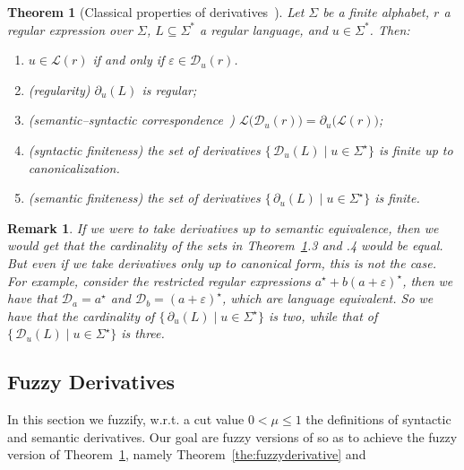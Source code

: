 \documentclass{article}
\newtheorem{theorem}{Theorem}[section]
\newtheorem{remark}{Remark}[section]
\begin{document}
\begin{theorem}[Classical properties of derivatives~\cite{B64,Thiemann2016}]\label{the:derivative}
\label{the:language-derivative-regular}\label{the:two-derivative-mapping}\label{the:derivative-set-is-finite}
Let $\Sigma$ be a finite alphabet, $r$ a regular expression over $\Sigma$,
$L\subseteq\Sigma^*$ a regular language, and $u\in\Sigma^*$. Then:
\begin{enumerate}
\item $u\in \mathcal L(r)$ if and only if $\varepsilon \in \mathcal{D}_{u}(r)$.
  \item (regularity) $\partial_u(L)$ is regular;
  \item (semantic--syntactic correspondence~\cite{B64,Thiemann2016})
        $\mathcal{L}\bigl(\mathcal{D}_{u}(r)\bigr)=\partial_{u}\bigl(\mathcal{L}(r)\bigr)$;
\item (syntactic finiteness) the set of derivatives $\bigl\{\, \mathcal D_{u}(L) \mid u \in \Sigma^\star \bigr\}$ is
        finite up to canonicalization.
  \item (semantic finiteness) the set of derivatives $\bigl\{\, \partial_{u}(L) \mid u \in \Sigma^\star \bigr\}$ is
        finite.
\end{enumerate}
\end{theorem}
{\color{red}\begin{remark} If we were to take derivatives up to semantic equivalence, then we would get that the cardinality of the sets in Theorem~\ref{the:derivative}.3 and .4 would be equal. But even if we take derivatives only up to canonical form, this is not the case. For example, consider the restricted regular expressions $a^\star
+b(a+\varepsilon)^\star$, then we have that $\mathcal D_a=a^\star$ and $\mathcal D_b=(a+\varepsilon)^\star$, which are language equivalent. So we have that the cardinality of $\bigl\{\, \partial_{u}(L) \mid u \in \Sigma^\star \bigr\}$ is two, while that of $\bigl\{\, \mathcal D_{u}(L) \mid u \in \Sigma^\star \bigr\}$ is three.\end{remark}}


\subsection{Fuzzy Derivatives}\label{sec:fuzzyderivatives}
In this section we fuzzify, w.r.t. a cut value $0<\mu\leq 1$ the definitions of syntactic and semantic derivatives. Our goal are fuzzy versions of so as to achieve the fuzzy version of Theorem~\ref{the:derivative}, namely Theorem~\ref{the:fuzzyderivative} and 
\end{document}
